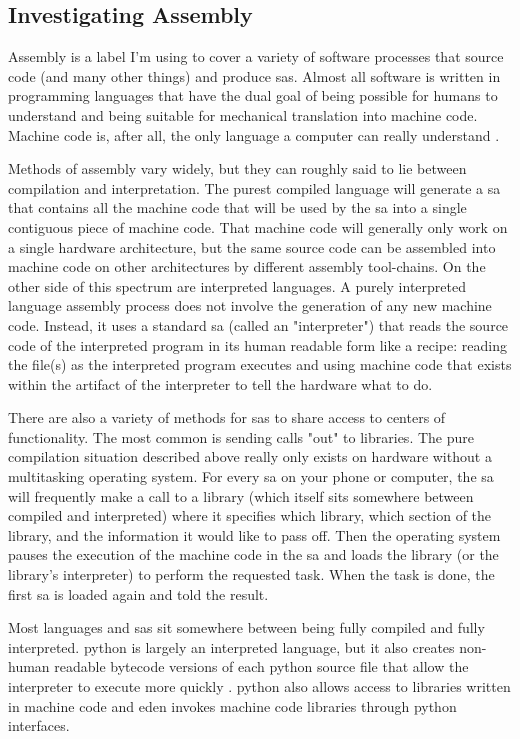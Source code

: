 \documentclass[a4paper,man,natbib,floatsintext]{apa6}
\begin{document}
   \subsection{Investigating Assembly}
   Assembly is a label I'm using to cover a variety of software processes that source code (and many other things) and produce \glspl{sa}. Almost all software is written in programming languages that have the dual goal of being possible for humans to understand and being suitable for mechanical translation into machine code. Machine code is, after all, the only language a computer can really understand \citep{Cramer2008-cw}. 

   Methods of assembly vary widely, but they can roughly said to lie between compilation and interpretation. The purest compiled language will generate a \gls{sa} that contains all the machine code that will be used by the \gls{sa} into a single contiguous piece of machine code. That machine code will generally only work on a single hardware architecture, but the same source code can be assembled into machine code on other architectures by different assembly tool-chains. On the other side of this spectrum are interpreted languages. A purely interpreted language assembly process does not involve the generation of any new machine code. Instead, it uses a standard \gls{sa} (called an "interpreter") that reads the source code of the interpreted program in its human readable form like a recipe: reading the file(s) as the interpreted program executes and using machine code that exists within the artifact of the interpreter to tell the hardware what to do.

   There are also a variety of methods for \glspl{sa} to share access to centers of functionality. The most common is sending calls "out" to libraries. The pure compilation situation described above really only exists on hardware without a multitasking operating system. For every \gls{sa} on your phone or computer, the \gls{sa} will frequently make a call to a library (which itself sits somewhere between compiled and interpreted) where it specifies which library, which section of the library, and the information it would like to pass off. Then the operating system pauses the execution of the machine code in the \gls{sa} and loads the library (or the library's interpreter) to perform the requested task. When the task is done, the first \gls{sa} is loaded again and told the result. 

   Most languages and \glspl{sa} sit somewhere between being fully compiled and fully interpreted. \Gls{python} is largely an interpreted language, but it also creates non-human readable bytecode versions of each python source file that allow the interpreter to execute more quickly \citep{The_Python_Software_Foundation2020-qz}. \Gls{python} also allows access to libraries written in machine code and \acrshort{eden} invokes machine code libraries through \gls{python} interfaces.
\end{document}

